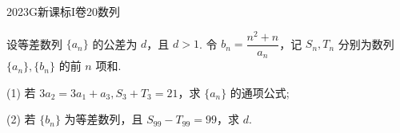 
\begin{problem}{2023}{G}{新课标I卷}{20}{数列}

设等差数列 $\{a_n\}$ 的公差为 $d$，且 $d>1$. 令 $b_n=\dfrac{n^2+n}{a_n}$，记 $S_n, T_n$ 分别为数列 $\{a_n\}, \{b_n\}$ 的前 $n$ 项和.

(1) 若 $3a_2=3a_1+a_3, S_3+T_3=21$，求 $\{a_n\}$ 的通项公式;

(2) 若 $\{b_n\}$ 为等差数列，且 $S_{99}-T_{99}=99$，求 $d$.

\end{problem}